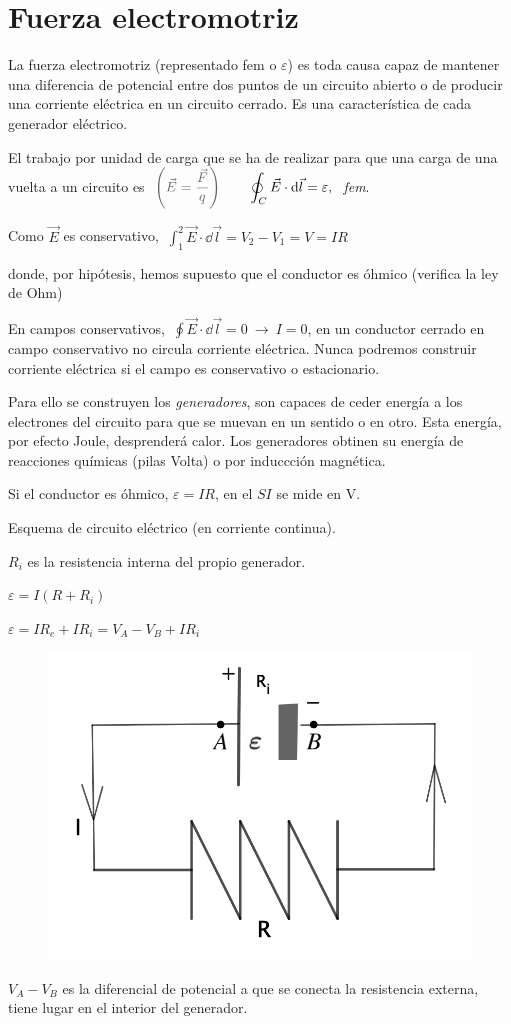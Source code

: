 \section{Fuerza electromotriz}


La fuerza electromotriz (representado fem o $\varepsilon$)
es toda causa capaz de mantener una diferencia de potencial entre dos puntos de un circuito abierto o de producir una corriente eléctrica en un circuito cerrado. Es una característica de cada generador eléctrico.

El trabajo por unidad de carga que se ha de realizar para que una carga de una vuelta a un circuito es
$\ \textcolor{gris}{\left( \vec E = \dfrac {\vec F}{q} \right)} \qquad \displaystyle
\oint_C \vec E \cdot \dd \vec l = \varepsilon,\ $ \emph{fem}.

Como $\vec E$ es conservativo, $\ \displaystyle \int_1^2 \vec E \cdot \dd \vec l = V_2-V_1=V=IR$

donde, por hipótesis, hemos supuesto que el conductor es óhmico (verifica la ley de Ohm)

En campos conservativos, $\ \displaystyle \oint \vec E \cdot \dd \vec l =0 \ \to \ I=0$, en un conductor cerrado en campo conservativo no circula corriente eléctrica. Nunca podremos construir corriente eléctrica si el campo es conservativo o estacionario.

Para ello se construyen los \emph{generadores}, son capaces de ceder energía a los electrones del circuito para que se muevan en un sentido o en otro. Esta energía, por efecto Joule, desprenderá calor. Los generadores obtinen su energía de reacciones químicas (pilas Volta) o por induccción magnética.

Si el conductor es óhmico, $\varepsilon=IR$, en el $SI$ se mide en $\mathrm{V}$.

\begin{multicols}{2}
Esquema de circuito eléctrico (en corriente continua).

$R_i$ es la resistencia interna del propio generador.

$\varepsilon=I(R+R_i)$

$\varepsilon=IR_e+IR_i=V_A-V_B+IR_i$
	\begin{figure}[H]
	\centering
	\includegraphics[width=.4\textwidth]{imagenes/imagenes25/T25IM05.png}
\end{figure}
\end{multicols}
$V_A-V_B$ es la diferencial de potencial a que se conecta la resistencia externa, tiene lugar en el interior del generador.

